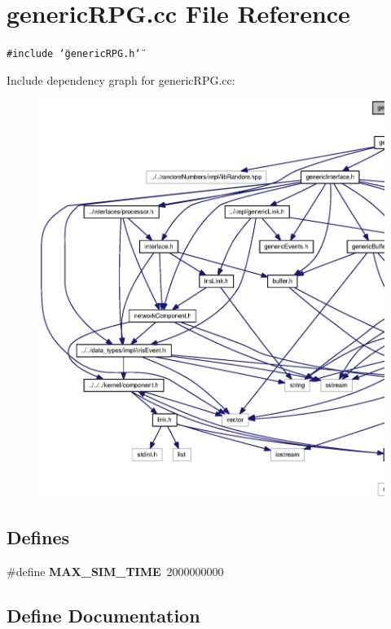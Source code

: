 \section{genericRPG.cc File Reference}
\label{genericRPG_8cc}
{\tt \#include \char`\"{}genericRPG.h\char`\"{}}\par


Include dependency graph for genericRPG.cc:\nopagebreak
\begin{figure}[H]
\begin{center}
\leavevmode
\includegraphics[width=420pt]{genericRPG_8cc__incl}
\end{center}
\end{figure}
\subsection*{Defines}
\begin{CompactItemize}
\item 
\#define {\bf MAX\_\-SIM\_\-TIME}~2000000000
\end{CompactItemize}


\subsection{Define Documentation}
